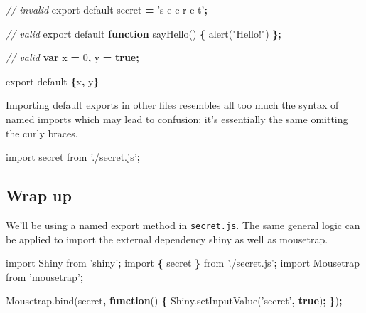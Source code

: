 \documentclass[10pt,]{krantz}
\makeatletter
\newenvironment{Shaded}{\begin{snugshade}}{\end{snugshade}}
\newcommand{\AttributeTok}[1]{\textcolor[rgb]{0.61,0.61,0.61}{#1}}
\newcommand{\CommentTok}[1]{\textcolor[rgb]{0.37,0.37,0.37}{\textit{#1}}}
\newcommand{\DecValTok}[1]{\textcolor[rgb]{0.06,0.06,0.06}{#1}}
\newcommand{\ImportTok}[1]{#1}
\newcommand{\KeywordTok}[1]{\textcolor[rgb]{0.27,0.27,0.27}{\textbf{#1}}}
\newcommand{\NormalTok}[1]{#1}
\newcommand{\OperatorTok}[1]{\textcolor[rgb]{0.43,0.43,0.43}{\textbf{#1}}}
\newcommand{\StringTok}[1]{\textcolor[rgb]{0.5,0.5,0.5}{#1}}
\newcommand{\VariableTok}[1]{\textcolor[rgb]{0,0,0}{#1}}
\newenvironment{kframe}{%
\medskip{}
\setlength{\fboxsep}{.8em}
 \def\at@end@of@kframe{}%
 \ifinner\ifhmode%
  \def\at@end@of@kframe{\end{minipage}}%
  \begin{minipage}{\columnwidth}%
 \fi\fi%
 \def\FrameCommand##1{\hskip\@totalleftmargin \hskip-\fboxsep
 \colorbox{shadecolor}{##1}\hskip-\fboxsep
     \hskip-\linewidth \hskip-\@totalleftmargin \hskip\columnwidth}%
 \MakeFramed {\advance\hsize-\width
   \@totalleftmargin\z@ \linewidth\hsize
   \@setminipage}}%
 {\par\unskip\endMakeFramed%
 \at@end@of@kframe}
\renewenvironment{Shaded}{\begin{kframe}}{\end{kframe}}
\makeatother
\begin{document}
\begin{Shaded}
\begin{Highlighting}[]
\CommentTok{// invalid}
\ImportTok{export} \ImportTok{default}\NormalTok{ secret }\OperatorTok{=} \StringTok{'s e c r e t'}\OperatorTok{;}

\CommentTok{// valid}
\ImportTok{export} \ImportTok{default} \KeywordTok{function} \AttributeTok{sayHello}\NormalTok{() }\OperatorTok{\{}
  \AttributeTok{alert}\NormalTok{(}\StringTok{"Hello!"}\NormalTok{)}
\OperatorTok{\};}

\CommentTok{// valid}
\KeywordTok{var}\NormalTok{ x }\OperatorTok{=} \DecValTok{0}\OperatorTok{,}
\NormalTok{    y }\OperatorTok{=} \KeywordTok{true}\OperatorTok{;}

\ImportTok{export} \ImportTok{default} \OperatorTok{\{}\NormalTok{x}\OperatorTok{,}\NormalTok{ y}\OperatorTok{\}}
\end{Highlighting}
\end{Shaded}

Importing default exports in other files resembles all too much the syntax of named imports which may lead to confusion: it's essentially the same omitting the curly braces.

\begin{Shaded}
\begin{Highlighting}[]
\ImportTok{import}\NormalTok{ secret }\ImportTok{from} \StringTok{'./secret.js'}\OperatorTok{;}
\end{Highlighting}
\end{Shaded}

\hypertarget{webpack-intro-import-export-wrap-up}{%
\subsection{Wrap up}\label{webpack-intro-import-export-wrap-up}}

We'll be using a named export method in \texttt{secret.js}. The same general logic can be applied to import the external dependency shiny as well as mousetrap.

\begin{Shaded}
\begin{Highlighting}[]
\ImportTok{import}\NormalTok{ Shiny }\ImportTok{from} \StringTok{'shiny'}\OperatorTok{;}
\ImportTok{import} \OperatorTok{\{}\NormalTok{ secret }\OperatorTok{\}} \ImportTok{from} \StringTok{'./secret.js'}\OperatorTok{;}
\ImportTok{import}\NormalTok{ Mousetrap }\ImportTok{from} \StringTok{'mousetrap'}\OperatorTok{;}

\VariableTok{Mousetrap}\NormalTok{.}\AttributeTok{bind}\NormalTok{(secret}\OperatorTok{,} \KeywordTok{function}\NormalTok{() }\OperatorTok{\{} 
  \VariableTok{Shiny}\NormalTok{.}\AttributeTok{setInputValue}\NormalTok{(}\StringTok{'secret'}\OperatorTok{,} \KeywordTok{true}\NormalTok{)}\OperatorTok{;}
\OperatorTok{\}}\NormalTok{)}\OperatorTok{;}
\end{Highlighting}
\end{Shaded}
\end{document}
